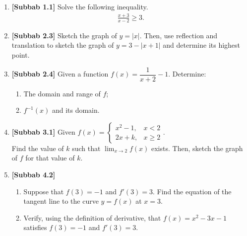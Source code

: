 \documentclass[10pt,openany,a4paper]{article}
\theoremstyle{definition}
\theoremstyle{definition}
\theoremstyle{plain}
\begin{document}
\begin{enumerate}
    \item \textbf{[Subbab 1.1]} Solve the following inequality.
    \begin{align*}
        \frac{x+3}{x-2}\geq 3.
    \end{align*}

    \item \textbf{[Subbab 2.3]} Sketch the graph of $y=|x|$. Then, use reflection and translation to sketch the graph of $y=3-|x+1|$ and determine its highest point.

    \item \textbf{[Subbab 2.4]} Given a function $f(x)=\dfrac{1}{x+2}-1$. Determine:
    \begin{enumerate}
        \item[a)] The domain and range of $f$;
        \item[b)] $f^{-1}(x)$ and its domain.
    \end{enumerate}

    \item \textbf{[Subbab 3.1]} Given $f(x)=\begin{cases}
        x^2-1, & x<2\\
        2x+k, & x\geq 2
    \end{cases}$.\\
    Find the value of $k$ such that $\displaystyle\lim_{x\to 2}f(x)$ exists. Then, sketch the graph of $f$ for that value of $k$.

    \item \textbf{[Subbab 4.2]}
    \begin{enumerate}
        \item[a.] Suppose that $f(3)=-1$ and $f'(3)=3$. Find the equation of the tangent line to the curve $y=f(x)$ at $x=3$.
        \item[b.] Verify, using the definition of derivative, that $f(x)=x^2-3x-1$ satisfies $f(3)=-1$ and $f'(3)=3$.
    \end{enumerate}
\end{enumerate}

\newpage
\end{document}
